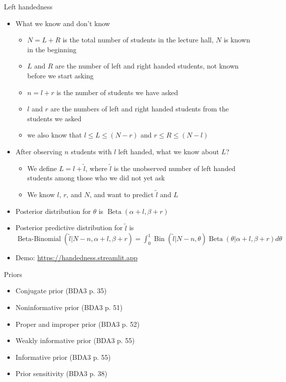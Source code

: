 \documentclass[english,t]{beamer}
\DeclareMathOperator{\Bin}{Bin}
\DeclareMathOperator{\Beta}{Beta}
\DeclareMathOperator{\BetaBinomial}{Beta-Binomial}
\begin{document}
\begin{frame}{Left handedness}

  \vspace{-0.5\baselineskip}
  \begin{itemize}
  \item What we know and don't know
    \begin{itemize}
    \item $N=L+R$ is the total number of students in the lecture hall,
      $N$ is known in the beginning
    \item $L$ and $R$ are the number of left and right handed students, not known before we start asking
    \item $n=l+r$ is the number of students we have asked
    \item $l$ and $r$ are the numbers of left and right handed students from the students we asked
    \item we also know that $l \leq L \leq (N-r)$ and $r \leq R \leq (N-l)$
    \end{itemize}
  \item After observing $n$ students with $l$ left handed, what we
    know about $L$?
    \begin{itemize}
    \item We define $L=l+\tilde{l}$, where $\tilde{l}$ is the
      unobserved number of left handed students among those who we did
      not yet ask
    \item We know $l$, $r$, and $N$, and want to predict $\tilde{l}$ and $L$
    \end{itemize}
  \item {\color{blue} Posterior} distribution for
    $\theta$ is $\Beta(\alpha+l, \beta+r)$
  \item {\color{red} Posterior predictive} distribution for
    $\displaystyle\tilde{l}$ is\\
    $\BetaBinomial(\tilde{l} | N-n, \alpha+l, \beta+r)=\int_0^1\Bin(\tilde{l} | N-n, \theta)\Beta(\theta | \alpha+l, \beta+r)d\theta$
  \item {\small Demo: \url{https://handedness.streamlit.app}}
  \end{itemize}
  
\end{frame}

\begin{frame}{Priors}

  \begin{itemize}
  \item Conjugate prior (BDA3 p. 35)
  \item Noninformative prior (BDA3 p. 51)
  \item Proper and improper prior (BDA3 p. 52)
  \item Weakly informative prior (BDA3 p. 55)
  \item Informative prior (BDA3 p. 55)
  \item Prior sensitivity (BDA3 p. 38)
  \end{itemize}

\end{frame}
\end{document}

